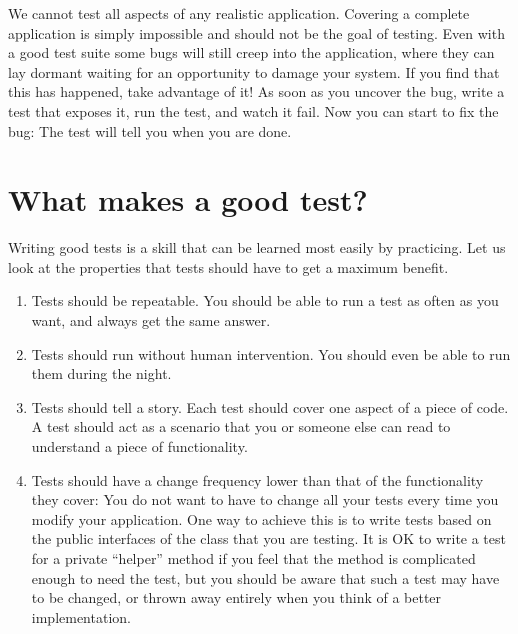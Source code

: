 \documentclass[a4paper,10pt,twoside]{book}
\begin{document}

We cannot test all aspects of any realistic application.
Covering a complete application is simply impossible and should not be the goal of testing.
Even with a good test suite some bugs will still creep into the application, where they can lay dormant waiting for an opportunity to damage your system.
If you find that this has happened, take advantage of it!
As soon as you uncover the bug, write a test that exposes it, run the test, and watch it fail.
Now you can start to fix the bug:
The test will tell you when you are done.
\section{What makes a good test?}

Writing good tests is a skill that can be learned most easily by practicing.
Let us look at the properties that tests should have to get a maximum benefit.

\begin{enumerate}
\item Tests should be repeatable.
	You should be able to run a test as often as you want, and always get the same answer.

\item Tests should run without human intervention.
	You should even be able to run them during the night.

\item Tests should tell a story.
	Each test should cover one aspect of a piece of code.
	A test should act as a scenario that you or someone else can read to understand a piece of functionality.
	\label{prop:oneAspect}

\item Tests should have a change frequency lower than that of the functionality they cover:
	You do not want to have to change all your tests every time you modify your application.
	One way to achieve this is to write tests based on the public interfaces of the class that you are testing.
	It is OK to write a test for a private ``helper'' method if you feel that the method is complicated enough to need the test, but you should be aware that such a test may have to be changed, or thrown away entirely when you think of a better implementation.
\end{enumerate}
\end{document}
